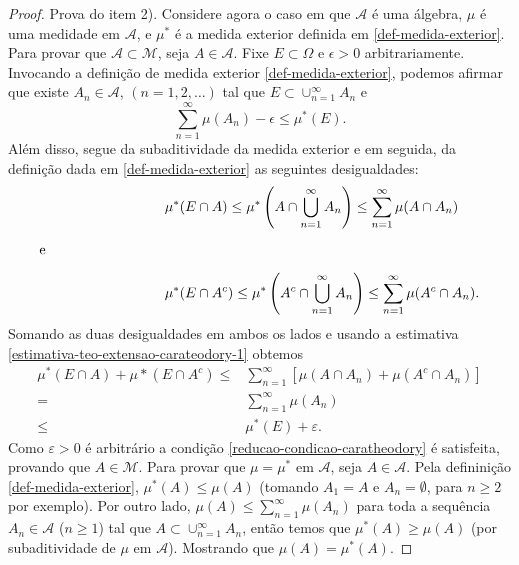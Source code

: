 \begin{proof}
Prova do item 2). Considere agora o caso em que $ \mathcal{A}$ é uma álgebra, $\mu$ é uma 
medidade em $ \mathcal{A} $, e $ \mu^* $ é a medida exterior definida em \eqref{def-medida-exterior}.
Para provar que $ \mathcal{A} \subset \mathcal{M} $, seja $ A \in \mathcal{A} $. Fixe 
$E \subset \Omega $ e $ \epsilon > 0 $ arbitrariamente. 
Invocando a definição de medida exterior \eqref{def-medida-exterior}, 
podemos afirmar que existe $ A_n \in \mathcal{A}$, 
$(n =1, 2 , \dots)$ tal que $ E \subset \cup_{n=1}^{\infty} A_n $ e 
\begin{equation}\label{estimativa-teo-extensao-carateodory-1}
  \sum_{n=1}^{\infty} \mu(A_n)-\epsilon \leq \mu^*(E).
\end{equation}
Além disso, segue da subaditividade da medida exterior e em seguida, 
da definição dada em \eqref{def-medida-exterior} as seguintes desigualdades: 
\begin{align*}
    &\mu^*(E \cap A)  \le \mu^*\left( A \cap \bigcup_{n=1}^{\infty} A_n\right) 
                      \le \sum_{n=1}^{\infty}\mu(A \cap  A_n)
     \\[0.2cm]
     \text{e} \hspace*{3cm}&
     \\[0.2cm]
     &\mu^*(E \cap A^c)  \le \mu^*\left(A^c \cap \bigcup_{n=1}^{\infty} A_n\right) 
                                \le \sum_{n=1}^{\infty}\mu(A^c \cap  A_n).
\end{align*}
Somando as duas desigualdades em ambos os lados e 
usando a estimativa \eqref{estimativa-teo-extensao-carateodory-1}
obtemos 
\begin{align*}
     \mu^*(E \cap A)+ \mu*(E \cap A^c)
     \le& 
     \sum_{n=1}^{\infty}[\mu(A \cap  A_n) +  \mu(A^c \cap  A_n)]
     \\[0.2cm]
     =& 
     \sum_{n=1}^{\infty}\mu(A_n) 
     \\[0.2cm]
     \leq&
     \mu^*(E)+\varepsilon.
\end{align*}
Como $\varepsilon>0$ é arbitrário a condição \eqref{reducao-condicao-caratheodory} 
é satisfeita, provando que $ A \in \mathcal{M}$. 
Para provar que $ \mu = \mu^* $ em $ \mathcal{A} $, seja $ A \in \mathcal{A}$. Pela defininição 
\eqref{def-medida-exterior}, $ \mu^*(A) \le \mu(A) $ (tomando $ A_1 = A $ e $ A_n = \emptyset $,
para $ n \ge 2 $ por exemplo). Por outro lado, $ \mu(A) \le \sum_{n=1}^{\infty} \mu(A_n)  $ para toda
a sequência $ A_n \in \mathcal{A} $ ($  n \ge 1$) tal que $ A \subset \cup_{n=1}^{\infty} A_n $, então
temos que  $ \mu^*(A) \ge \mu(A) $ (por subaditividade de $\mu$ em $ \mathcal{A} $).
Mostrando que $ \mu(A) = \mu^*(A)$.


\end{proof}
